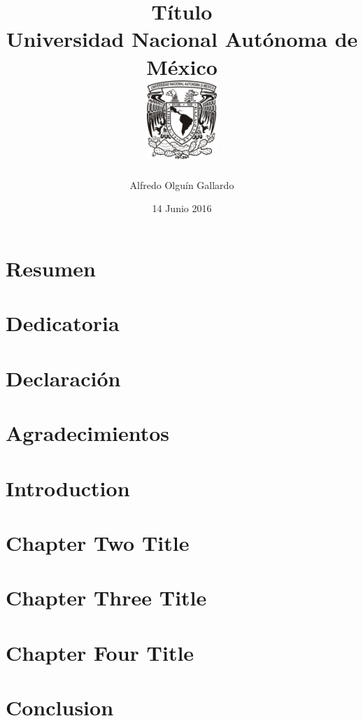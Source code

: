 \documentclass[twoside,12pt,onehalfspace, spanish]{report}
\begin{document}
\title{
	{Título}\\
	{\large Universidad Nacional Autónoma de México}\\
	{\includegraphics[width=0.2\textwidth]{university.jpg}}
}
\author{Alfredo Olguín Gallardo}
\date{14 Junio 2016}

\maketitle

\chapter*{Resumen}


\chapter*{Dedicatoria}


\chapter*{Declaración}


\chapter*{Agradecimientos}


\tableofcontents
\chapter{Introduction}


\chapter{Chapter Two Title}


\chapter{Chapter Three Title}


\chapter{Chapter Four Title}


\chapter{Conclusion}

\end{document}
